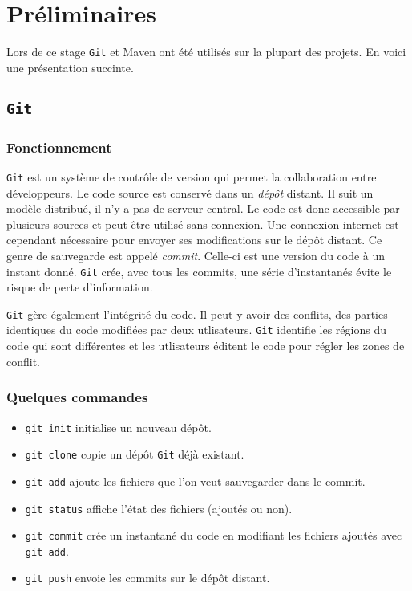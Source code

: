 \chapter*{Préliminaires}
Lors de ce stage \texttt{Git} et Maven ont été utilisés sur la plupart des projets. En voici une présentation succinte.
\section*{\texttt{Git}}
\subsection*{Fonctionnement}
\texttt{Git} est un système de contrôle de version qui permet la collaboration entre développeurs. Le code source est conservé dans un \textit{dépôt} distant. Il suit un modèle distribué, il n'y a pas de serveur central. Le code est donc accessible par plusieurs sources et peut être utilisé sans connexion. Une connexion internet est cependant nécessaire pour envoyer ses modifications sur le dépôt distant. Ce genre de sauvegarde est appelé \textit{commit}. Celle-ci est une version du code à un instant donné. \texttt{Git} crée, avec tous les commits, une série d’instantanés évite le risque de perte d'information.

\texttt{Git} gère également l'intégrité du code. Il peut y avoir des conflits, des parties identiques du code modifiées par deux utlisateurs. \texttt{Git} identifie les régions du code qui sont différentes et les utlisateurs éditent le code pour régler les zones de conflit.

\subsection*{Quelques commandes}

\begin{itemize}
    \item \texttt{git init} initialise un nouveau dépôt.
    \item \texttt{git clone} copie un dépôt \texttt{Git} déjà existant.
    \item \texttt{git add} ajoute les fichiers que l'on veut sauvegarder dans le commit.
    \item \texttt{git status} affiche l'état des fichiers (ajoutés ou non).
    \item \texttt{git commit} crée un instantané du code en modifiant les fichiers ajoutés avec \texttt{git add}.
    \item \texttt{git push} envoie les commits sur le dépôt distant.
\end{itemize}

